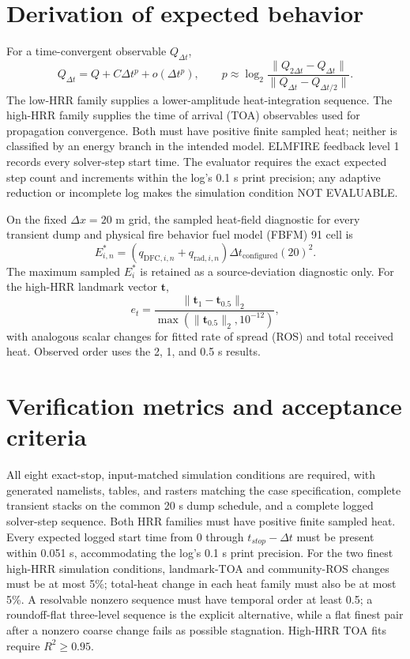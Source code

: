 \section{Derivation of expected behavior}
For a time-convergent observable $Q_{\Delta t}$,
\begin{equation}
 Q_{\Delta t}=Q+C\Delta t^p+o(\Delta t^p),
 \qquad
 p\approx\log_2\frac{\lVert Q_{2\Delta t}-Q_{\Delta t}\rVert}
 {\lVert Q_{\Delta t}-Q_{\Delta t/2}\rVert}.
\end{equation}
The low-HRR family supplies a lower-amplitude heat-integration sequence. The
high-HRR family supplies the time of arrival (TOA) observables used for propagation convergence.
Both must have positive finite sampled heat; neither is classified by an
energy branch in the intended model. ELMFIRE feedback level 1
records every solver-step start time.  The evaluator requires the exact expected
step count and increments within the log's 0.1 s print precision; any adaptive
reduction or incomplete log makes the simulation condition NOT EVALUABLE.

On the fixed $\Delta x=20$ m grid, the sampled heat-field diagnostic for every
transient dump and physical fire behavior fuel model (FBFM) 91 cell is
\[
 E_{i,n}^{*}=(q_{\mathrm{DFC},i,n}+q_{\mathrm{rad},i,n})
 \Delta t_{\mathrm{configured}}(20)^2.
\]
The maximum sampled $E_i^{*}$ is retained as a source-deviation diagnostic
only. For the high-HRR landmark vector $\mathbf{t}$,
\[
 e_t=\frac{\lVert\mathbf{t}_{1}-\mathbf{t}_{0.5}\rVert_2}
 {\max(\lVert\mathbf{t}_{0.5}\rVert_2,10^{-12})},
\]
with analogous scalar changes for fitted rate of spread (ROS) and total received heat.  Observed order uses the 2, 1, and 0.5 s results.

\section{Verification metrics and acceptance criteria}
All eight exact-stop, input-matched simulation conditions are required, with generated namelists, tables, and rasters matching the case specification, complete transient stacks on the common 20 s dump schedule, and a complete logged solver-step sequence. Both HRR families must have positive finite sampled heat. Every expected logged start time from 0 through $t_{stop}-\Delta t$ must be present within 0.051 s, accommodating the log's 0.1 s print precision. For the two finest high-HRR simulation conditions, landmark-TOA and community-ROS changes must be at most 5\%; total-heat change in each heat family must also be at most 5\%. A resolvable nonzero sequence must have temporal order at least 0.5; a roundoff-flat three-level sequence is the explicit alternative, while a flat finest pair after a nonzero coarse change fails as possible stagnation. High-HRR TOA fits require $R^2\geq0.95$.

